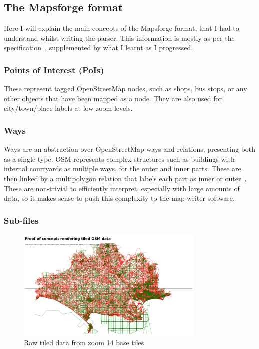 \documentclass{final_report}
\begin{document}
\subsection{The Mapsforge format}

Here I will explain the main concepts of the Mapsforge format, that I had to understand whilst writing the parser. This information is mostly as per the specification~\cite{mapsforge-format}, supplemented by what I learnt as I progressed.

\subsubsection{Points of Interest (PoIs)}

These represent tagged OpenStreetMap nodes, such as shops, bus stops, or any other objects that have been mapped as a node. They are also used for city/town/place labels at low zoom levels.

\subsubsection{Ways}

Ways are an abstraction over OpenStreetMap ways and relations, presenting both as a single type. OSM represents complex structures such as buildings with internal courtyards as multiple ways, for the outer and inner parts. These are then linked by a multipolygon relation that labels each part as inner or outer~\cite{osm-wiki-multipolygon}. These are non-trivial to efficiently interpret, especially with large amounts of data, so it makes sense to push this complexity to the map-writer software.

\subsubsection{Sub-files}

\begin{figure}[ht]
    \centering
    \includegraphics[width=0.8\textwidth]{../proof-of-concepts/4-rendering-osm-data/screenshots/high-detail-at-low-zoom.png}
    \caption{Raw tiled data from zoom 14 base tiles}\label{fig:rendering-tiles}
\end{figure}
\end{document}
